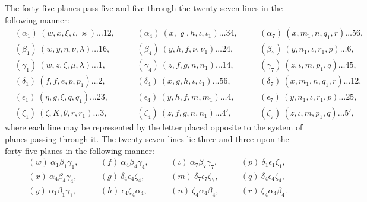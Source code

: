 \documentclass[11pt,a4paper]{article}
\theoremstyle{definition}
\begin{document}
The forty-five planes pass five and five through the twenty-seven lines in the following manner:
\begin{align*}
&(\alpha_{1})\ (w, x, \xi, \iota, \varkappa) \ldots 12, \quad &&(\alpha_{4})\ (x, \varrho, h, \iota, \iota_{1}) \ldots 34, \quad &&(\alpha_{7})\ (x, m_{1}, n, q_{1}, r) \ldots 56, \\
&(\beta_{1})\ (w, y, \eta, \nu, \lambda) \ldots 16, \quad &&(\beta_{4})\ (y, h, f, \nu, \nu_{1}) \ldots 24, \quad &&(\beta_{7})\ (y, n_{1}, \iota, r_{1}, p) \ldots 6, \\
&(\gamma_{1})\ (w, z, \zeta, \mu, \lambda) \ldots 1, \quad &&(\gamma_{4})\ (z, f, g, n, n_{1}) \ldots 14, \quad &&(\gamma_{7})\ (z, \iota, m, p_{1}, q) \ldots 45, \\
&(\delta_{1})\ (f, f, e, p, p_{1}) \ldots 2, \quad &&(\delta_{4})\ (x, g, h, \iota, \iota_{1}) \ldots 56, \quad &&(\delta_{7})\ (x, m_{1}, n, q_{1}, r) \ldots 12, \\
&(\epsilon_{1})\ (\eta, g, \xi, q, q_{1}) \ldots 23, \quad &&(\epsilon_{4})\ (y, h, f, m, m_{1}) \ldots 4, \quad &&(\epsilon_{7})\ (y, n_{1}, \iota, r_{1}, p) \ldots 25, \\
&(\zeta_{1})\ (\zeta, K, \theta, r, r_{1}) \ldots 3, \quad &&(\zeta_{4})\ (z, f, g, n, n_{1}) \ldots 4', \quad &&(\zeta_{7})\ (z, \iota, m, p_{1}, q) \ldots 5',
\end{align*}
where each line may be represented by the letter placed opposite to the system of planes passing through it. The twenty-seven lines lie three and three upon the forty-five planes in the following manner:
\begin{align*}
&(w)\ \alpha_{1}\beta_{1}\gamma_{1}, \quad &&(f)\ \alpha_{4}\beta_{4}\gamma_{4}, \quad &&(\iota)\ \alpha_{7}\beta_{7}\gamma_{7}, \quad &&(p)\ \delta_{1}\epsilon_{1}\zeta_{1}, \\
&(x)\ \alpha_{4}\beta_{4}\gamma_{4}, \quad &&(g)\ \delta_{4}\epsilon_{4}\zeta_{4}, \quad &&(m)\ \delta_{7}\epsilon_{7}\zeta_{7}, \quad &&(q)\ \delta_{4}\epsilon_{4}\zeta_{4}, \\
&(y)\ \alpha_{1}\beta_{1}\gamma_{1}, \quad &&(h)\ \epsilon_{4}\zeta_{4}\alpha_{4}, \quad &&(n)\ \zeta_{4}\alpha_{4}\beta_{4}, \quad &&(r)\ \zeta_{4}\alpha_{4}\beta_{4}.
\end{align*}

\newpage

\setcounter{page}{451}
\end{document}
